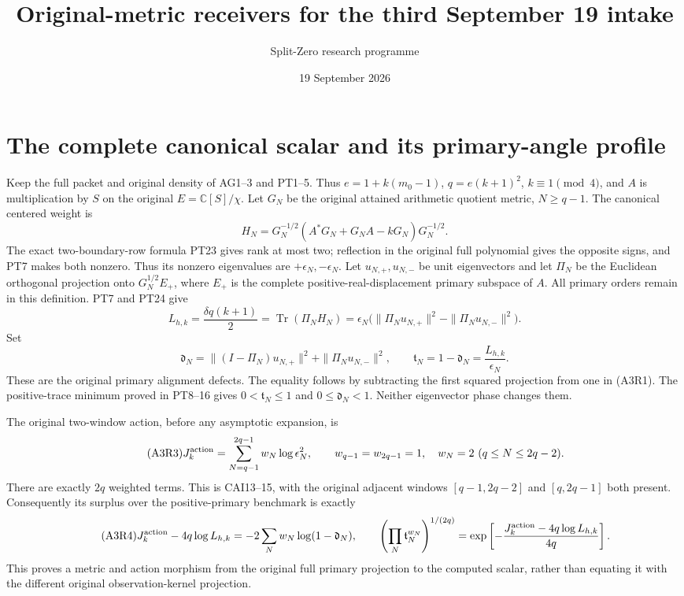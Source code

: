 \documentclass[11pt]{article}
\title{Original-metric receivers for the third September 19 intake}
\author{Split-Zero research programme}\date{19 September 2026}
\newcommand{\C}{\mathbb C}\newcommand{\Tr}{\operatorname{Tr}}
\begin{document}
\maketitle

\section{The complete canonical scalar and its primary-angle profile}
Keep the full packet and original density of AG1--3 and PT1--5.
Thus $e=1+k(m_0-1)$, $q=e(k+1)^2$, $k\equiv1\pmod4$,
and $A$ is multiplication by $S$ on the original $E=\C[S]/\chi$.
Let $G_N$ be the original attained arithmetic quotient metric, $N\ge q-1$.
The canonical centered weight is
\[
 H_N=G_N^{-1/2}(A^*G_N+G_NA-kG_N)G_N^{-1/2}.
\]
The exact two-boundary-row formula PT23 gives rank at most two;
reflection in the original full polynomial gives the opposite signs,
and PT7 makes both nonzero. Thus its nonzero eigenvalues are
$+\epsilon_N,-\epsilon_N$. Let $u_{N,+},u_{N,-}$ be
unit eigenvectors and let $\Pi_N$ be the Euclidean orthogonal projection onto
$G_N^{1/2}E_+$, where $E_+$ is the complete positive-real-displacement
primary subspace of $A$. All primary orders remain in this definition.
PT7 and PT24 give
\begin{equation}\tag{A3R1}
 L_{h,k}=\frac{\delta q(k+1)}2
 =\Tr(\Pi_NH_N)
 =\epsilon_N\bigl(\|\Pi_Nu_{N,+}\|^2-\|\Pi_Nu_{N,-}\|^2\bigr).
\end{equation}
Set
\begin{equation}\tag{A3R2}
 \mathfrak d_N=\|(I-\Pi_N)u_{N,+}\|^2+\|\Pi_Nu_{N,-}\|^2,
 \qquad \mathfrak t_N=1-\mathfrak d_N=\frac{L_{h,k}}{\epsilon_N}.
\end{equation}
These are the original primary alignment defects. The equality follows
by subtracting the first squared projection from one in (A3R1).
The positive-trace minimum proved in PT8--16 gives
$0<\mathfrak t_N\le1$ and $0\le \mathfrak d_N<1$. Neither eigenvector phase changes them.

The original two-window action, before any asymptotic expansion, is
\begin{equation}\tag{A3R3}
 J_k^{\rm action}=\sum_{N=q-1}^{2q-1}w_N\log\epsilon_N^2,
 \qquad w_{q-1}=w_{2q-1}=1,\quad w_N=2\ (q\le N\le2q-2).
\end{equation}
There are exactly $2q$ weighted terms. This is CAI13--15, with the
original adjacent windows $[q-1,2q-2]$ and $[q,2q-1]$ both present.
Consequently its surplus over the positive-primary benchmark is exactly
\begin{equation}\tag{A3R4}
 J_k^{\rm action}-4q\log L_{h,k}
 =-2\sum_Nw_N\log(1-\mathfrak d_N),\qquad
 \left(\prod_N\mathfrak t_N^{w_N}\right)^{1/(2q)}
 =\exp\left[-\frac{J_k^{\rm action}-4q\log L_{h,k}}{4q}\right].
\end{equation}
This proves a metric and action morphism from the original full primary
projection to the computed scalar, rather than equating it with the
different original observation-kernel projection.
\end{document}
